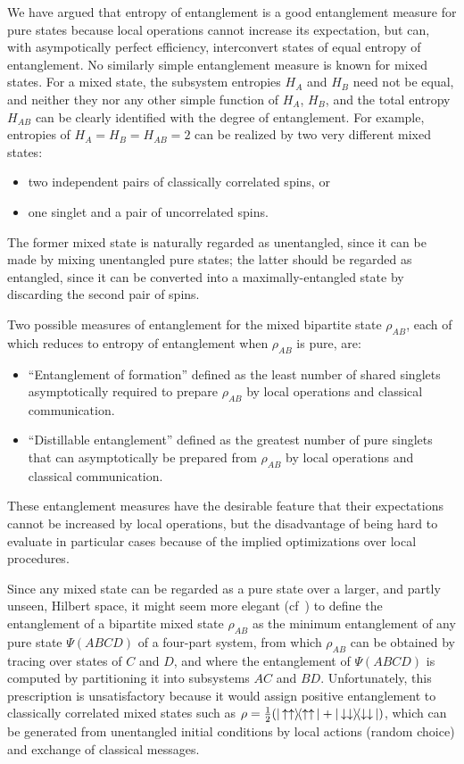 We have argued that entropy of entanglement is a good entanglement
measure for pure states because local operations cannot increase
its expectation, but can, with asympotically perfect efficiency,
interconvert states of equal entropy of entanglement.  No similarly
simple entanglement measure is known for mixed states.  For a mixed
state, the subsystem entropies $H_A$ and $H_B$ need not be equal, and
neither they nor any other simple function of $H_A$, $H_B$, and the
total entropy $H_{AB}$ can be clearly identified with the degree of
entanglement.  For example, entropies of $H_A=H_B=H_{AB}=2$ can be
realized by two very different mixed states:
 \begin{itemize}
 \item two independent pairs of classically correlated spins, or
 \item one singlet and a pair of uncorrelated spins.
 \end{itemize} The former mixed state is naturally regarded as
unentangled, since it can be made by mixing unentangled pure states; the
latter should be regarded as entangled, since it can be converted into a
maximally-entangled state by discarding the second pair of spins.

Two possible measures of entanglement for the mixed
bipartite state $\rho_{AB}$, each of which reduces to
entropy of entanglement when $\rho_{AB}$ is pure, are:
 \begin{itemize}
 \item ``Entanglement of formation'' defined as the least
number of shared singlets asymptotically required to
prepare $\rho_{AB}$ by local operations and classical communication.
 \item ``Distillable entanglement'' defined as the greatest
number of pure singlets that can asymptotically be prepared
from $\rho_{AB}$ by local operations and classical communication.
 \end{itemize}
These entanglement measures have the desirable feature that
their expectations
cannot be increased by local operations, but the disadvantage of being
hard to evaluate in particular cases because of the
implied optimizations over local procedures.

Since any mixed state can be regarded as a pure state over a
larger, and partly unseen, Hilbert space, it might seem more
elegant (cf~\cite{J94}) to define the entanglement of a bipartite 
mixed state $\rho_{AB}$ as the minimum entanglement of any pure state
$\Psi(ABCD)$ of a four-part system, from which $\rho_{AB}$ can
be obtained by tracing over states of $C$ and $D$, and where the
entanglement of $\Psi(ABCD)$ is computed by partitioning it into
subsystems $AC$ and $BD$.  Unfortunately, this prescription
is unsatisfactory because it would assign positive
entanglement to classically correlated mixed states such as $\rho
= \mbox{$\textstyle \frac{1}{2}$} (\left | \, \uparrow\uparrow \right \rangle\!\!\left \langle \uparrow\uparrow \, \right | + \left | \, \downarrow\downarrow \right \rangle\!\!\left \langle \downarrow\downarrow \, \right |)$,
which can be generated from unentangled initial conditions by
local actions (random choice) and exchange of classical messages.

